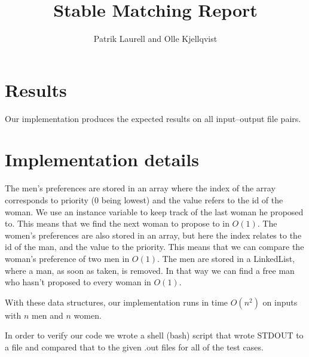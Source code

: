 \documentclass{tufte-handout}
\title{Stable Matching Report}
\author{Patrik Laurell and Olle Kjellqvist}
\begin{document}
  \maketitle

  \section{Results}

  Our implementation produces the expected results on all input--output file pairs. 

  \section{Implementation details}

  The men's preferences are stored in an array where the index of the array corresponds to priority (0 being lowest) and the value refers to the id of the woman. We use an instance variable to keep track of the last woman he proposed to. This means that we find the next woman to propose to in $O(1)$.
  The women's preferences are also stored in an array, but here the index relates to the id of the man, and the value to the priority. This means that we can compare the woman's preference of two men in $O(1)$.
  The men are stored in a LinkedList, where a man, as soon as taken, is removed. In that way we can find a free man who hasn't proposed to every woman in $O(1)$.

  With these data structures, our implementation runs in time $O(n^2)$ on inputs with $n$ men and $n$ women.

In order to verify our code we wrote a shell (bash) script that wrote STDOUT to a file and compared that to the given .out files for all of the test cases.
\end{document}
